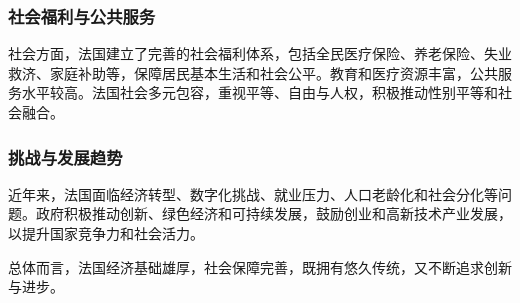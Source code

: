 \subsubsection{社会福利与公共服务}

社会方面，法国建立了完善的社会福利体系，包括全民医疗保险、养老保险、失业救济、家庭补助等，保障居民基本生活和社会公平。教育和医疗资源丰富，公共服务水平较高。法国社会多元包容，重视平等、自由与人权，积极推动性别平等和社会融合。

\subsubsection{挑战与发展趋势}

近年来，法国面临经济转型、数字化挑战、就业压力、人口老龄化和社会分化等问题。政府积极推动创新、绿色经济和可持续发展，鼓励创业和高新技术产业发展，以提升国家竞争力和社会活力。

总体而言，法国经济基础雄厚，社会保障完善，既拥有悠久传统，又不断追求创新与进步。
